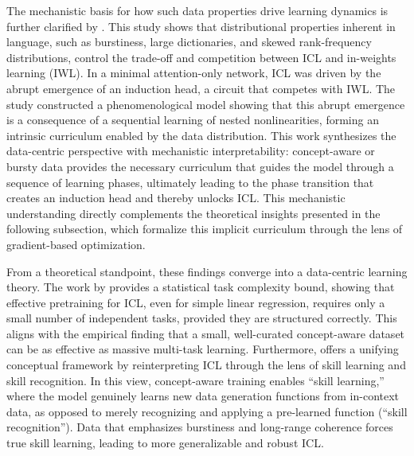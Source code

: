 \documentclass[11pt]{article}
\begin{document}
The mechanistic basis for how such data properties drive learning dynamics is further clarified by \cite{ref55}. This study shows that distributional properties inherent in language, such as burstiness, large dictionaries, and skewed rank-frequency distributions, control the trade-off and competition between ICL and in-weights learning (IWL). In a minimal attention-only network, ICL was driven by the abrupt emergence of an induction head, a circuit that competes with IWL. The study constructed a phenomenological model showing that this abrupt emergence is a consequence of a sequential learning of nested nonlinearities, forming an intrinsic curriculum enabled by the data distribution. This work synthesizes the data-centric perspective with mechanistic interpretability: concept-aware or bursty data provides the necessary curriculum that guides the model through a sequence of learning phases, ultimately leading to the phase transition that creates an induction head and thereby unlocks ICL. This mechanistic understanding directly complements the theoretical insights presented in the following subsection, which formalize this implicit curriculum through the lens of gradient-based optimization.

From a theoretical standpoint, these findings converge into a data-centric learning theory. The work by \cite{ref49} provides a statistical task complexity bound, showing that effective pretraining for ICL, even for simple linear regression, requires only a small number of independent tasks, provided they are structured correctly. This aligns with the empirical finding that a small, well-curated concept-aware dataset can be as effective as massive multi-task learning. Furthermore, \cite{ref6} offers a unifying conceptual framework by reinterpreting ICL through the lens of skill learning and skill recognition. In this view, concept-aware training enables ``skill learning,'' where the model genuinely learns new data generation functions from in-context data, as opposed to merely recognizing and applying a pre-learned function (``skill recognition''). Data that emphasizes burstiness and long-range coherence forces true skill learning, leading to more generalizable and robust ICL.
\end{document}
